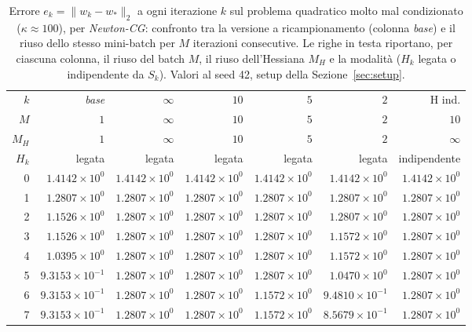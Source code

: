 \begin{table}[H]
\centering
\footnotesize
\renewcommand{\arraystretch}{0.85}
\setlength{\tabcolsep}{2pt}
\caption{Errore $e_k=\|w_k-w_*\|_2$ a ogni iterazione $k$ sul problema quadratico molto mal condizionato ($\kappa\approx 100$), per \emph{Newton-CG}: confronto tra la versione a ricampionamento (colonna \emph{base}) e il riuso dello stesso mini-batch per $M$ iterazioni consecutive. Le righe in testa riportano, per ciascuna colonna, il riuso del batch $M$, il riuso dell'Hessiana $M_H$ e la modalità ($H_k$ legata o indipendente da $S_k$). Valori al seed 42, setup della Sezione~\ref{sec:setup}.}
\label{tab:riuso_veryill_ncg}
\begin{tabular}{@{}rrrrrrr@{}}
\toprule
$k$ & \emph{base} & $\infty$ & $10$ & $5$ & $2$ & H ind.\\
$M$ & $1$ & $\infty$ & $10$ & $5$ & $2$ & $10$\\
$M_H$ & $1$ & $\infty$ & $10$ & $5$ & $2$ & $\infty$\\
$H_k$ & legata & legata & legata & legata & legata & indipendente\\
\midrule
0 & $1.4142\times10^{0}$ & $1.4142\times10^{0}$ & $1.4142\times10^{0}$ & $1.4142\times10^{0}$ & $1.4142\times10^{0}$ & $1.4142\times10^{0}$\\
1 & $1.2807\times10^{0}$ & $1.2807\times10^{0}$ & $1.2807\times10^{0}$ & $1.2807\times10^{0}$ & $1.2807\times10^{0}$ & $1.2807\times10^{0}$\\
2 & $1.1526\times10^{0}$ & $1.2807\times10^{0}$ & $1.2807\times10^{0}$ & $1.2807\times10^{0}$ & $1.2807\times10^{0}$ & $1.2807\times10^{0}$\\
3 & $1.1526\times10^{0}$ & $1.2807\times10^{0}$ & $1.2807\times10^{0}$ & $1.2807\times10^{0}$ & $1.1572\times10^{0}$ & $1.2807\times10^{0}$\\
4 & $1.0395\times10^{0}$ & $1.2807\times10^{0}$ & $1.2807\times10^{0}$ & $1.2807\times10^{0}$ & $1.1572\times10^{0}$ & $1.2807\times10^{0}$\\
5 & $9.3153\times10^{-1}$ & $1.2807\times10^{0}$ & $1.2807\times10^{0}$ & $1.2807\times10^{0}$ & $1.0470\times10^{0}$ & $1.2807\times10^{0}$\\
6 & $9.3153\times10^{-1}$ & $1.2807\times10^{0}$ & $1.2807\times10^{0}$ & $1.1572\times10^{0}$ & $9.4810\times10^{-1}$ & $1.2807\times10^{0}$\\
7 & $9.3153\times10^{-1}$ & $1.2807\times10^{0}$ & $1.2807\times10^{0}$ & $1.1572\times10^{0}$ & $8.5679\times10^{-1}$ & $1.2807\times10^{0}$\\

\end{tabular}
\end{table}
